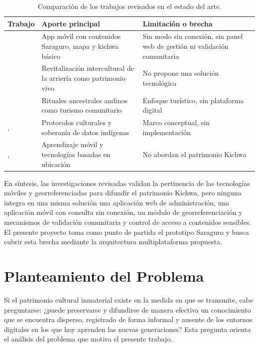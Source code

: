 \begin{table}[htbp]
  \centering
  \caption{Comparación de los trabajos revisados en el estado del arte.}
  \label{tab:estado_arte}
  \begin{tabular}{|p{}|p{}|p{}|}
    \hline
    \textbf{Trabajo} & \textbf{Aporte principal} & \textbf{Limitación o brecha} \tabularnewline
    \hline
    \raggedright \cite{quezada2026mobile} & \raggedright App móvil con contenidos Saraguro, mapa y kichwa básico & \raggedright Sin modo sin conexión, sin panel web de gestión ni validación comunitaria \tabularnewline
    \hline
    \raggedright \cite{quezada2026muleteering} & \raggedright Revitalización intercultural de la arriería como patrimonio vivo & \raggedright No propone una solución tecnológica \tabularnewline
    \hline
    \raggedright \cite{torres2022ancestral} & \raggedright Rituales ancestrales andinos como turismo comunitario & \raggedright Enfoque turístico, sin plataforma digital \tabularnewline
    \hline
    \raggedright \cite{christen2012information}, \cite{hudson2023indigenous} & \raggedright Protocolos culturales y soberanía de datos indígenas & \raggedright Marco conceptual, sin implementación \tabularnewline
    \hline
    \raggedright \cite{sarrab2012mobile}, \cite{gretzel2015smart} & \raggedright Aprendizaje móvil y tecnologías basadas en ubicación & \raggedright No abordan el patrimonio Kichwa \tabularnewline
    \hline
  \end{tabular}
\end{table}

En síntesis, las investigaciones revisadas validan la pertinencia de las tecnologías móviles y georreferenciadas para difundir el patrimonio Kichwa, pero ninguna integra en una misma solución una aplicación web de administración, una aplicación móvil con consulta sin conexión, un módulo de georreferenciación y mecanismos de validación comunitaria y control de acceso a contenidos sensibles. El presente proyecto toma como punto de partida el prototipo Saraguro \cite{quezada2026mobile} y busca cubrir esta brecha mediante la arquitectura multiplataforma propuesta.

\section{Planteamiento del Problema}
Si el patrimonio cultural inmaterial existe en la medida en que se transmite, cabe preguntarse: ¿puede preservarse y difundirse de manera efectiva un conocimiento que se encuentra disperso, registrado de forma informal y ausente de los entornos digitales en los que hoy aprenden las nuevas generaciones? Esta pregunta orienta el análisis del problema que motiva el presente trabajo.

